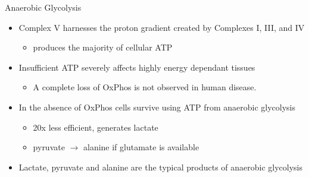 \documentclass[presentation, smaller]{beamer}
\begin{document}
\begin{frame}[label={sec:org5b23458}]{Anaerobic Glycolysis}
\begin{itemize}
\item Complex V harnesses the proton gradient created by Complexes I, III, and IV
\begin{itemize}
\item produces the majority of cellular ATP
\end{itemize}
\item Insufficient ATP severely affects highly energy dependant tissues
\begin{itemize}
\item A complete loss of OxPhos is not observed in human disease.
\end{itemize}
\item In the absence of OxPhos cells survive using ATP from anaerobic glycolysis
\begin{itemize}
\item 20x less efficient, generates lactate
\item pyruvate \(\to\) alanine if glutamate is available
\end{itemize}
\item Lactate, pyruvate and alanine are the typical products of anaerobic glycolysis
\end{itemize}
\end{frame}
\end{document}
